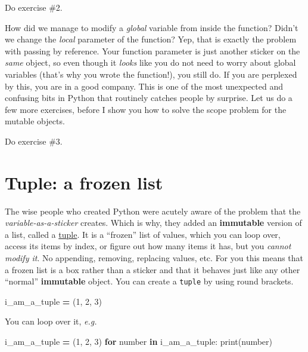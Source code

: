 \documentclass[
]{book}
\newenvironment{Shaded}{\begin{snugshade}}{\end{snugshade}}
\newcommand{\BuiltInTok}[1]{#1}
\newcommand{\ControlFlowTok}[1]{\textcolor[rgb]{0.13,0.29,0.53}{\textbf{#1}}}
\newcommand{\DecValTok}[1]{\textcolor[rgb]{0.00,0.00,0.81}{#1}}
\newcommand{\KeywordTok}[1]{\textcolor[rgb]{0.13,0.29,0.53}{\textbf{#1}}}
\newcommand{\NormalTok}[1]{#1}
\newcommand{\OperatorTok}[1]{\textcolor[rgb]{0.81,0.36,0.00}{\textbf{#1}}}
\begin{document}
Do exercise \#2.

How did we manage to modify a \emph{global} variable from inside the function? Didn't we change the \emph{local} parameter of the function? Yep, that is exactly the problem with passing by reference. Your function parameter is just another sticker on the \emph{same} object, so even though it \emph{looks} like you do not need to worry about global variables (that's why you wrote the function!), you still do. If you are perplexed by this, you are in a good company. This is one of the most unexpected and confusing bits in Python that routinely catches people by surprise. Let us do a few more exercises, before I show you how to solve the scope problem for the mutable objects.

Do exercise \#3.

\hypertarget{tuple-a-frozen-list}{%
\section{Tuple: a frozen list}\label{tuple-a-frozen-list}}

The wise people who created Python were acutely aware of the problem that the \emph{variable-as-a-sticker} creates. Which is why, they added an \textbf{immutable} version of a list, called a \href{https://docs.python.org/3/library/stdtypes.html?highlight=tuple\#tuple}{tuple}. It is a ``frozen'' list of values, which you can loop over, access its items by index, or figure out how many items it has, but you \emph{cannot modify it}. No appending, removing, replacing values, etc. For you this means that a frozen list is a box rather than a sticker and that it behaves just like any other ``normal'' \textbf{immutable} object. You can create a \texttt{tuple} by using round brackets.

\begin{Shaded}
\begin{Highlighting}[]
\NormalTok{i\_am\_a\_tuple }\OperatorTok{=}\NormalTok{ (}\DecValTok{1}\NormalTok{, }\DecValTok{2}\NormalTok{, }\DecValTok{3}\NormalTok{)}
\end{Highlighting}
\end{Shaded}

You can loop over it, \emph{e.g.}

\begin{Shaded}
\begin{Highlighting}[]
\NormalTok{i\_am\_a\_tuple }\OperatorTok{=}\NormalTok{ (}\DecValTok{1}\NormalTok{, }\DecValTok{2}\NormalTok{, }\DecValTok{3}\NormalTok{)}
\ControlFlowTok{for}\NormalTok{ number }\KeywordTok{in}\NormalTok{ i\_am\_a\_tuple:}
    \BuiltInTok{print}\NormalTok{(number)}
\end{Highlighting}
\end{Shaded}
\end{document}
